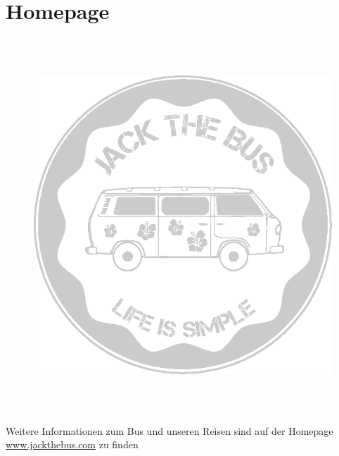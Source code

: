 \documentclass[11pt,nswissgerman]{article}
\begin{document}
\section{Homepage}
\begin{figure}[H]
    \centering
    \includegraphics[width=\textwidth,height=14cm, keepaspectratio]{../Bilder/Logo/Logo_trans.png}
    \label{img:Logo_trans}
\end{figure}
\vfill
    \begin{center}
        {\huge  Weitere Informationen zum Bus und unseren Reisen sind auf der Homepage {\url{www.jackthebus.com}} zu finden}
\end{center}
\end{document}
